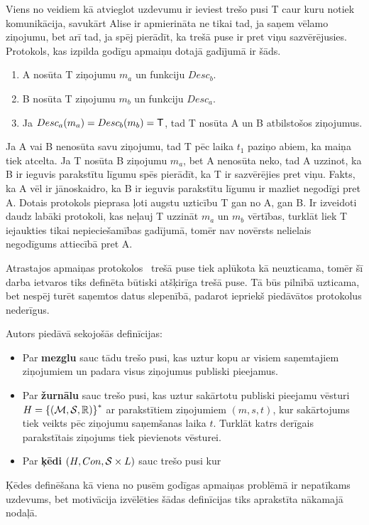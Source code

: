 Viens no veidiem kā atvieglot uzdevumu ir ieviest trešo pusi T caur kuru notiek komunikācija, savukārt Alise ir apmierināta ne tikai tad, ja saņem vēlamo ziņojumu, bet arī tad, ja spēj pierādīt, ka trešā puse ir pret viņu sazvērējusies.
Protokols, kas izpilda godīgu apmaiņu dotajā gadījumā ir šāds.
\begin{enumerate}
    \item A nosūta T ziņojumu $m_a$ un funkciju $Desc_b$.
    \item B nosūta T ziņojumu $m_b$ un funkciju $Desc_a$.
    \item Ja $Desc_a(m_a) = Desc_b(m_b) = \textsf{T}$, tad T nosūta A un B atbilstošos ziņojumus.
\end{enumerate}
Ja A vai B nenosūta savu ziņojumu, tad T pēc laika $t_1$ paziņo abiem, ka maiņa tiek atcelta. Ja T nosūta B ziņojumu $m_a$, bet A nenosūta neko, tad A uzzinot, ka B ir ieguvis parakstītu līgumu spēs pierādīt, ka T ir sazvērējies pret viņu. Fakts, ka A vēl ir jānoskaidro, ka B ir ieguvis parakstītu līgumu ir mazliet negodīgi pret A. Dotais protokols pieprasa ļoti augstu uzticību T gan no A, gan B. Ir izveidoti daudz labāki protokoli, kas neļauj T uzzināt $m_a$ un $m_b$ vērtības, turklāt liek T iejaukties tikai nepieciešamības gadījumā, tomēr nav novērsts nelielais negodīgums attiecībā pret A.\cite{asokan98}

Atrastajos apmaiņas protokolos~\cite{asokan98,schunter00}%
trešā puse tiek aplūkota kā neuzticama, tomēr šī darba ietvaros tiks definēta būtiski atšķirīga trešā puse. Tā būs pilnībā uzticama, bet nespēj turēt saņemtos datus slepenībā, padarot iepriekš piedāvātos protokolus nederīgus.

Autors piedāvā sekojošās definīcijas:
\begin{itemize}
    \item Par \textbf{mezglu} sauc tādu trešo pusi, kas uztur kopu ar visiem saņemtajiem ziņojumiem un padara visus ziņojumus publiski pieejamus.
    \item Par \textbf{žurnālu} sauc trešo pusi, kas uztur sakārtotu publiski pieejamu vēsturi
        $H = {\{(\mathcal{M}, \mathcal{S}, \mathbb{R})\}}^*$
        ar parakstītiem ziņojumiem $(m,s,t)$,
        kur sakārtojums tiek veikts pēc ziņojumu saņemšanas laika $t$.
        Turklāt katrs derīgais parakstītais ziņojums tiek pievienots vēsturei.
    \item Par \textbf{ķēdi} $(H, Con, \mathcal{S}\times L)$ sauc trešo pusi kur %
\end{itemize}
Ķēdes definēšana kā viena no pusēm godīgas apmaiņas problēmā ir nepatīkams uzdevums, bet motivācija izvēlēties šādas definīcijas tiks aprakstīta nākamajā nodaļā.

